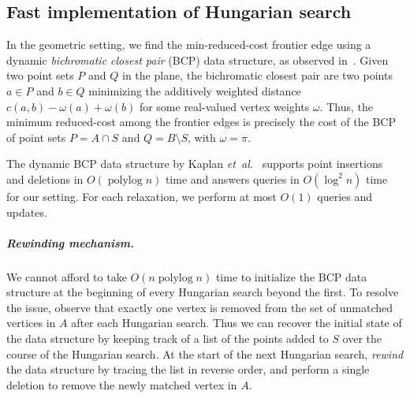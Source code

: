 \documentclass[a4paper,UKenglish]{socg-lipics-v2018}
\makeatletter
\def\etal{\emph{et~al.}}
\def\etal{\textit{et~al.}}
\def\polylog{\mathop{\mathrm{polylog}}}
\theoremstyle{plain}
\numberwithin{figure}{section}
\renewcommand{\paragraph}{\subparagraph}
\def\EMPH#1{\textcolor{BrickRed}{{\emph{#1}}}}
\def\n@te#1{\textsf{\boldmath \textbf{$\langle\!\langle$#1$\rangle\!\rangle$}}\leavevmode}
\def\note#1{\textcolor{red}{\n@te{#1}}}
\renewcommand{\note}[1]{} %
\makeatother
\begin{document}

\subsection{Fast implementation of Hungarian search}
\label{SS:fast-hungarian-matching}


In the geometric setting, we find the min-reduced-cost frontier edge using a dynamic
\EMPH{bichromatic closest pair} (BCP) data structure, as observed
in~\cite{AFPVX17,Vaidya89}.
Given two point sets $P$ and $Q$ in the plane, the bichromatic closest pair are two points
$a \in P$ and $b \in Q$ minimizing the additively weighted distance
$c(a, b) - \omega(a) + \omega(b)$ for some real-valued vertex weights $\omega$.
Thus, the minimum reduced-cost among the frontier edges is precisely the cost of the BCP of point sets
$P = A \cap S$ and $Q = B \setminus S$, with $\omega = \pi$.

The dynamic BCP data structure by Kaplan \etal~\cite{KMRSS17} supports point insertions and deletions in
$O(\polylog n)$ time and answers queries in $O(\log^2 n)$ time for our setting.
For each relaxation, we perform at most $O(1)$ queries and updates.

\paragraph{Rewinding mechanism.}
We cannot afford to take $O(n\polylog n)$ time to initialize the BCP data structure at the
beginning of every Hungarian search beyond the first.
To resolve the issue, observe that exactly one vertex is removed from the set of unmatched vertices in $A$ after each Hungarian search.
Thus we can recover the initial state of the data structure by keeping track of a list of the points added to $S$ over the course of the Hungarian search.
At the start of the next Hungarian search,
\emph{rewind} the data structure by tracing the list in reverse order, and perform a single deletion to remove the newly matched vertex in $A$.
\end{document}
